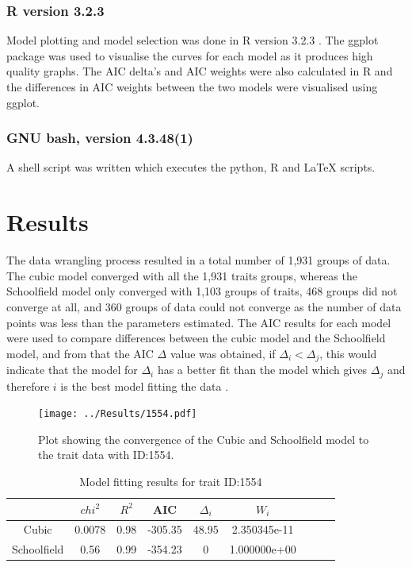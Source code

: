 {\subsubsection*{R version 3.2.3}
Model plotting and model selection was done in R version 3.2.3 \citep{R2015}. The ggplot package was used to visualise the curves for each model as it produces high quality graphs. The AIC delta's and AIC weights were also calculated in R and the differences in AIC weights between the two models were visualised using ggplot.  

\subsubsection*{GNU bash, version 4.3.48(1)} 
A shell script was written which executes the python, R and LaTeX scripts. 

\section*{Results}
The data wrangling process resulted in a total number of 1,931 groups of data. The cubic model converged with all the 1,931 traits groups, whereas the Schoolfield model only converged with 1,103 groups of traits, 468 groups did not converge at all, and 360 groups of data could not converge as the number of data points was less than the parameters estimated. The AIC results for each model were used to compare differences between the cubic model and the Schoolfield model, and from that the AIC $\Delta$ value was obtained, if $\Delta_i$$<$$\Delta_j$, this would indicate that the model for $\Delta_i$ has a better fit than the model which gives $\Delta_j$ and therefore $i$ is the best model fitting the data \citep{Burnham2004}. 

\begin{figure}[H]
	\centering
	\texttt{[image: ../Results/1554.pdf]}
	\caption{\label{fig:NLLS_fit}Plot showing the convergence of the Cubic and Schoolfield model to the trait data with ID:1554.}
\end{figure}

\begin{table}[H]
	\centering
	\caption{Model fitting results for trait ID:1554}
	\label{my-label}
	\begin{tabular}{|c|c|c|c|c|c|c|c|c|}
		\hline
	&$chi^2$&$R^2$&AIC&{$\Delta_i$}&$W_i$  \\ \hline
Cubic	&0.0078&0.98&-305.35&48.95&2.350345e-11\\ \hline
Schoolfield	&0.56&0.99&-354.23&0&1.000000e+00\\ \hline
	\end{tabular}
\end{table}

}
